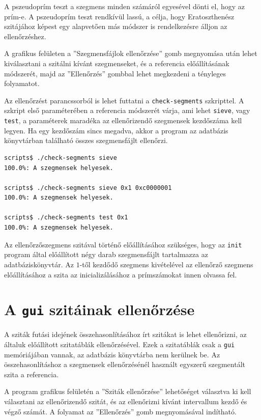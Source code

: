 A pszeudoprím teszt a szegmens minden számáról egyesével dönti el, hogy az prím-e.
A pszeudoprím teszt rendkívül lassú, a célja, hogy Eratoszthenész szitájához képest egy alapvetően más módszer is rendelkezésre álljon az ellenőrzéshez.

A grafikus felületen a ''Szegmensfájlok ellenőrzése'' gomb megnyomása után lehet kiválasztani a szitálni kívánt szegmenseket, és a referencia előállításának módszerét, majd az ''Ellenőrzés'' gombbal lehet megkezdeni a tényleges folyamatot.

Az ellenőrzést parancssorból is lehet futtatni a \texttt{check-segments} szkripttel.
A szkript első paraméterében a referencia módszerét várja, ami lehet \texttt{sieve}, vagy \texttt{test}, a paraméterek maradéka az ellenőrizendő szegmensek kezdőszáma kell legyen.
Ha egy kezdőszám sincs megadva, akkor a program az adatbázis könyvtárban található összes szegmensfájlt ellenőrzi.

\begin{lstlisting}[language=bash]
scripts$ ./check-segments sieve
100.0%: A szegmensek helyesek.             

scripts$ ./check-segments sieve 0x1 0xc0000001
100.0%: A szegmensek helyesek.             

scripts$ ./check-segments test 0x1
100.0%: A szegmensek helyesek.             

\end{lstlisting}

Az ellenőrzőszegmens szitával történő előállításához szükséges, hogy az \texttt{init} program által előállított négy darab szegmensfájlt tartalmazza az adatbáziskönyvtár.
Az $1$-től kezdődő szegmens kivételével az ellenőrző szegmens előállításához a szita az inicializálásához a prímszámokat innen olvassa fel.

\section{A \texttt{gui} szitáinak ellenőrzése}
\label{sec:szitak-ellenorzese}

A sziták futási idejének összehasonlításához írt szitákat is lehet ellenőrizni, az általuk előállított szitatáblák ellenőrzésével.
Ezek a szitatáblák csak a \texttt{gui} memóriájában vannak, az adatbázis könyvtárba nem kerülnek be.
Az összehasonlításhoz a szegmensek ellenőrzésénél használt egyszerű szegmentált szita a referencia.

A program grafikus felületén a ''Sziták ellenőrzése'' lehetőséget választva ki kell választani az ellenőrizendő szitát, és az ellenőrizni kívánt intervallum kezdő és végző számát.
A folyamat az ''Ellenőrzés'' gomb megnyomásával indítható.

